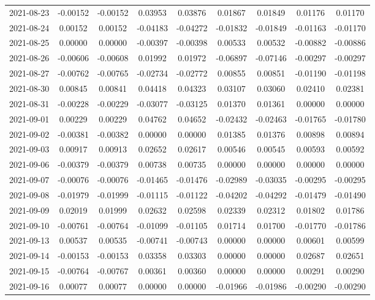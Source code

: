 \begin{footnotesize}
\begin{longtable}{lcccccccc}
2021-08-23 & -0.00152 & -0.00152 & 0.03953 & 0.03876 & 0.01867 & 0.01849 & 0.01176 & 0.01170 \\
2021-08-24 & 0.00152 & 0.00152 & -0.04183 & -0.04272 & -0.01832 & -0.01849 & -0.01163 & -0.01170 \\
2021-08-25 & 0.00000 & 0.00000 & -0.00397 & -0.00398 & 0.00533 & 0.00532 & -0.00882 & -0.00886 \\
2021-08-26 & -0.00606 & -0.00608 & 0.01992 & 0.01972 & -0.06897 & -0.07146 & -0.00297 & -0.00297 \\
2021-08-27 & -0.00762 & -0.00765 & -0.02734 & -0.02772 & 0.00855 & 0.00851 & -0.01190 & -0.01198 \\
2021-08-30 & 0.00845 & 0.00841 & 0.04418 & 0.04323 & 0.03107 & 0.03060 & 0.02410 & 0.02381 \\
2021-08-31 & -0.00228 & -0.00229 & -0.03077 & -0.03125 & 0.01370 & 0.01361 & 0.00000 & 0.00000 \\
2021-09-01 & 0.00229 & 0.00229 & 0.04762 & 0.04652 & -0.02432 & -0.02463 & -0.01765 & -0.01780 \\
2021-09-02 & -0.00381 & -0.00382 & 0.00000 & 0.00000 & 0.01385 & 0.01376 & 0.00898 & 0.00894 \\
2021-09-03 & 0.00917 & 0.00913 & 0.02652 & 0.02617 & 0.00546 & 0.00545 & 0.00593 & 0.00592 \\
2021-09-06 & -0.00379 & -0.00379 & 0.00738 & 0.00735 & 0.00000 & 0.00000 & 0.00000 & 0.00000 \\
2021-09-07 & -0.00076 & -0.00076 & -0.01465 & -0.01476 & -0.02989 & -0.03035 & -0.00295 & -0.00295 \\
2021-09-08 & -0.01979 & -0.01999 & -0.01115 & -0.01122 & -0.04202 & -0.04292 & -0.01479 & -0.01490 \\
2021-09-09 & 0.02019 & 0.01999 & 0.02632 & 0.02598 & 0.02339 & 0.02312 & 0.01802 & 0.01786 \\
2021-09-10 & -0.00761 & -0.00764 & -0.01099 & -0.01105 & 0.01714 & 0.01700 & -0.01770 & -0.01786 \\
2021-09-13 & 0.00537 & 0.00535 & -0.00741 & -0.00743 & 0.00000 & 0.00000 & 0.00601 & 0.00599 \\
2021-09-14 & -0.00153 & -0.00153 & 0.03358 & 0.03303 & 0.00000 & 0.00000 & 0.02687 & 0.02651 \\
2021-09-15 & -0.00764 & -0.00767 & 0.00361 & 0.00360 & 0.00000 & 0.00000 & 0.00291 & 0.00290 \\
2021-09-16 & 0.00077 & 0.00077 & 0.00000 & 0.00000 & -0.01966 & -0.01986 & -0.00290 & -0.00290 \\

\end{longtable}
\end{footnotesize}
